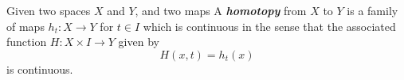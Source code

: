 \documentclass[preview]{standalone}
\begin{document}
\begin{center}
Given two spaces $X$ and $Y$, and two maps A \textbf{\textit{homotopy}} from $X$ to $Y$ is a family of maps $h_t : X \to Y$ for $t \in I$ which is continuous in the sense that the associated function $H : X \times I \to Y$ given by $$H(x,t) = h_t(x)$$ is continuous.
\end{center}
\end{document}
